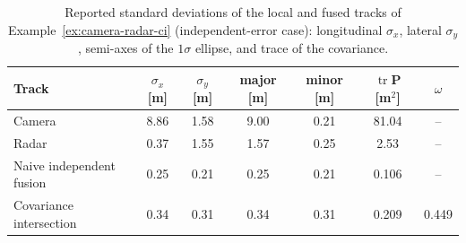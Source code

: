 \documentclass[graybox,envcountchap]{style/SNmono}
\DeclareMathOperator{\tr}{tr}
\begin{document}
\begin{example}
\begin{table}[!t]
    \centering
    \small
    \caption{Reported standard deviations of the local and fused tracks of Example~\ref{ex:camera-radar-ci} (independent-error case): longitudinal $\sigma_{x}$, lateral $\sigma_{y}$, semi-axes of the $1\sigma$ ellipse, and trace of the covariance.}
    \label{tab:camera-radar-ci}
    \begin{tabular}{lcccccc}
        \hline
        \textbf{Track} & $\sigma_{x}$ [m] & $\sigma_{y}$ [m] & major [m] & minor [m] & $\tr\mathbf{P}$ [m$^{2}$] & $\omega$ \\
        \hline
        Camera & 8.86 & 1.58 & 9.00 & 0.21 & 81.04 & -- \\
        Radar & 0.37 & 1.55 & 1.57 & 0.25 & 2.53 & -- \\
        Naive independent fusion & 0.25 & 0.21 & 0.25 & 0.21 & 0.106 & -- \\
        Covariance intersection & 0.34 & 0.31 & 0.34 & 0.31 & 0.209 & 0.449 \\
        \hline
    \end{tabular}
\end{table}


\end{example}
\end{document}
